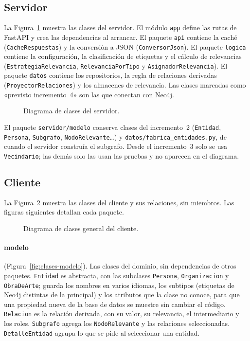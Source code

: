 \subsection{Servidor}

La Figura~\ref{fig:clases-servidor} muestra las clases del servidor. El módulo \texttt{app} define las rutas de FastAPI y crea las dependencias al arrancar. El paquete \texttt{api} contiene la caché (\texttt{CacheRespuestas}) y la conversión a JSON (\texttt{ConversorJson}). El paquete \texttt{logica} contiene la configuración, la clasificación de etiquetas y el cálculo de relevancias (\texttt{EstrategiaRelevancia}, \texttt{RelevanciaPorTipo} y \texttt{AsignadorRelevancia}). El paquete \texttt{datos} contiene los repositorios, la regla de relaciones derivadas (\texttt{ProyectorRelaciones}) y los almacenes de relevancia. Las clases marcadas como «previsto incremento~4» son las que conectan con Neo4j.

\begin{figure}
  \centering
  \caption{Diagrama de clases del servidor.}
  \label{fig:clases-servidor}
\end{figure}

El paquete \texttt{servidor/modelo} conserva clases del incremento~2 (\texttt{Entidad}, \texttt{Persona}, \texttt{Subgrafo}, \texttt{NodoRelevante}\ldots) y \texttt{datos/fabrica\_entidades.py}, de cuando el servidor construía el subgrafo. Desde el incremento~3 solo se usa \texttt{Vecindario}; las demás solo las usan las pruebas y no aparecen en el diagrama. 

\subsection{Cliente}

La Figura~\ref{fig:clases-cliente} muestra las clases del cliente y sus relaciones, sin miembros. Las figuras siguientes detallan cada paquete.

\begin{figure}
  \centering
  \caption{Diagrama de clases general del cliente.}
  \label{fig:clases-cliente}
\end{figure}

\paragraph{modelo} (Figura~\ref{fig:clases-modelo}). Las clases del dominio, sin dependencias de otros paquetes. \texttt{Entidad} es abstracta, con las subclases \texttt{Persona}, \texttt{Organizacion} y \texttt{ObraDeArte}; guarda los nombres en varios idiomas, los subtipos (etiquetas de Neo4j distintas de la principal) y los atributos que la clase no conoce, para que una propiedad nueva de la base de datos se muestre sin cambiar el código. \texttt{Relacion} es la relación derivada, con su valor, su relevancia, el intermediario y los roles. \texttt{Subgrafo} agrega los \texttt{NodoRelevante} y las relaciones seleccionadas. \texttt{DetalleEntidad} agrupa lo que se pide al seleccionar una entidad.

